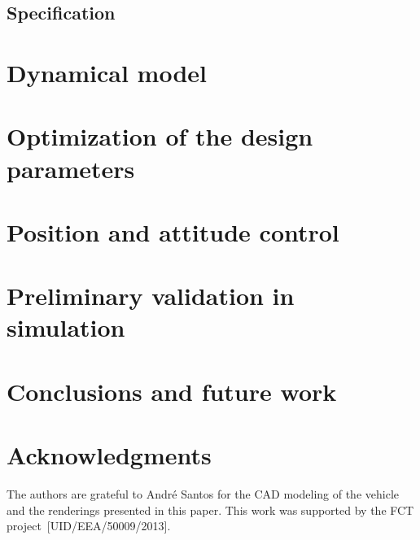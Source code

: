 \documentclass[11pt,a4paper]{article}
\begin{document}
\subsection{Specification}
\label{sec:specification}


\section{Dynamical model}
\label{sec:dynamical-model}


\section{Optimization of the design parameters}
\label{sec:design-parameters}


\section{Position and attitude control}
\label{sec:posit-attit-contr}


\section{Preliminary validation in simulation}
\label{sec:prel-valid}


\section{Conclusions and future work}
\label{sec:concl-future-work}


\section*{Acknowledgments}
\label{sec:acknowledgments}

The authors are grateful to André Santos for the CAD modeling of the
vehicle and the renderings presented in this paper. This work was
supported by the FCT project~[UID/EEA/50009/2013].



\end{document}
